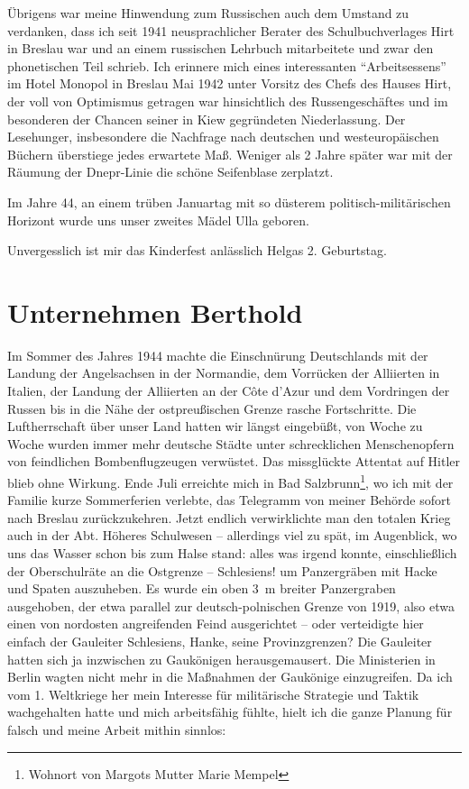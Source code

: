 Übrigens war meine Hinwendung zum Russischen auch dem Umstand zu verdanken, dass ich seit 1941 neusprachlicher Berater des Schulbuchverlages Hirt in Breslau war und an einem russischen Lehrbuch mitarbeitete und zwar den phonetischen Teil schrieb. Ich erinnere mich eines interessanten \enquote{Arbeitsessens} im Hotel Monopol in Breslau Mai 1942 unter Vorsitz des Chefs des Hauses Hirt, der voll von Optimismus getragen war hinsichtlich des Russengeschäftes und im besonderen der Chancen seiner in Kiew gegründeten Niederlassung. Der Lesehunger, insbesondere die Nachfrage nach deutschen und westeuropäischen Büchern überstiege jedes erwartete Maß. Weniger als 2 Jahre später war mit der Räumung der Dnepr-Linie die schöne Seifenblase zerplatzt.

Im Jahre 44, an einem trüben Januartag mit so düsterem politisch-militäri\-schen Horizont wurde uns unser zweites Mädel Ulla geboren.

Unvergesslich ist mir das Kinderfest anlässlich Helgas 2. Geburtstag.

\section{Unternehmen Berthold}

Im Sommer des Jahres 1944 machte die Einschnürung Deutschlands mit der Landung der Angelsachsen in der Normandie, dem Vorrücken der Alliierten in Italien, der Landung der Alliierten an der Côte d'Azur und dem Vordringen der Russen bis in die Nähe der  ostpreußischen Grenze rasche Fortschritte. Die Luftherrschaft über unser Land hatten wir längst eingebüßt, von Woche zu Woche wurden immer mehr deutsche Städte unter schrecklichen Menschenopfern von feindlichen Bombenflugzeugen verwüstet. Das missglückte Attentat auf Hitler blieb ohne Wirkung. Ende Juli erreichte mich in Bad Salzbrunn\footnote{Wohnort von Margots Mutter Marie Mempel}, wo ich mit der Familie kurze Sommerferien verlebte, das Telegramm von meiner Behörde sofort nach Breslau zurückzukehren. Jetzt endlich verwirklichte man den totalen Krieg auch in der Abt. Höheres Schulwesen -- allerdings viel zu spät, im Augenblick, wo uns das Wasser schon bis zum Halse stand: alles was irgend konnte, einschließlich der Oberschulräte an die Ostgrenze -- Schlesiens! um Panzergräben mit Hacke und Spaten auszuheben. Es wurde ein oben 3~m breiter Panzergraben ausgehoben, der etwa parallel zur deutsch-polnischen Grenze von 1919, also etwa einen von nordosten angreifenden Feind ausgerichtet -- oder verteidigte hier einfach der Gauleiter Schlesiens, Hanke, seine Provinzgrenzen? Die Gauleiter hatten sich ja inzwischen zu Gaukönigen herausgemausert. Die Ministerien in Berlin wagten nicht mehr in die Maßnahmen der Gaukönige einzugreifen. Da ich vom 1. Weltkriege her mein Interesse für militärische Strategie und Taktik wachgehalten hatte und mich arbeitsfähig fühlte, hielt ich die ganze Planung für falsch und meine Arbeit mithin sinnlos:


